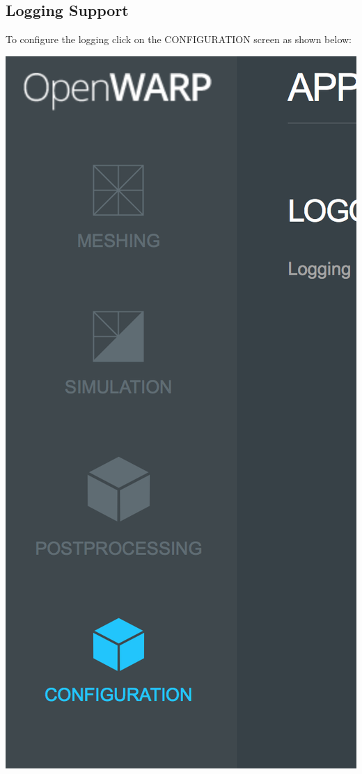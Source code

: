 \documentclass[12pt]{article}
\begin{document}
\subsection{Logging Support}

To configure the logging click on the CONFIGURATION screen as shown below:

\vspace{\abovedisplayskip}
\begin{minipage}{\linewidth}
	\centering
	\includegraphics[scale=0.5]{img/39-2}
\end{minipage}
\vspace{\belowdisplayskip}
\end{document}

